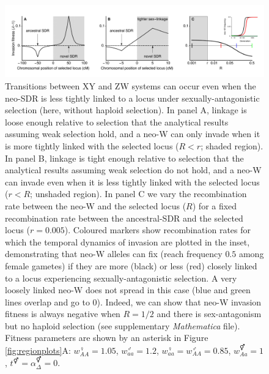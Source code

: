 \documentclass[12pt]{article}
\begin{document}
\begin{figure}[!h]
\centering
\centerline{\includegraphics[width=1.5\linewidth]{PositionPlot_SexAntagTighter_Mike}}
\caption{
Transitions between XY and ZW systems can occur even when the neo-SDR is less tightly linked to a locus under sexually-antagonistic selection (here, without haploid selection).
In panel A, linkage is loose enough relative to selection that the analytical results assuming weak selection hold, and a neo-W can only invade when it is more tightly linked with the selected locus ($R<r$; shaded region).
In panel B, linkage is tight enough relative to selection that the analytical results assuming weak selection do not hold, and a neo-W can invade even when it is less tightly linked with the selected locus ($r<R$; unshaded region).
In panel C we vary the recombination rate between the neo-W and the selected locus ($R$) for a fixed recombination rate between the ancestral-SDR and the selected locus ($r=0.005$). 
Coloured markers show recombination rates for which the temporal dynamics of invasion are plotted in the inset, demonstrating that neo-W alleles can fix (reach frequency $0.5$ among female gametes) if they are more (black) or less (red) closely linked to a locus experiencing sexually-antagonistic selection. 
A very loosely linked neo-W does not spread in this case (blue and green lines overlap and go to 0). 
Indeed, we can show that neo-W invasion fitness is always negative when $R=1/2$ and there is sex-antagonism but no haploid selection (see supplementary \textit{Mathematica} file). 
Fitness parameters are shown by an asterisk in Figure \ref{fig:regionplots}A: $w_{AA}^\female = 1.05$, $w_{aa}^\male = 1.2$, $w_{aa}^\female = w_{AA}^\male = 0.85$, $w_{Aa}^\Hermaphrodite = 1$,  $t^\Hermaphrodite = \alpha^\Hermaphrodite_\Delta = 0$.
}
\label{fig:SexAntagTighter}
\end{figure}
\end{document}
